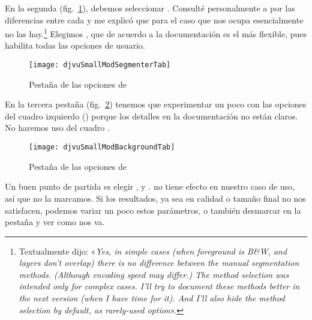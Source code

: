 \documentclass[%
	a5paper,
	10pt,
	twoside,
	openright,
	final,
]{memoir}
\begin{document}
{	En la segunda (fig.~\ref{fig:djvuSmallModSegmenterTab}), debemos seleccionar . Consulté personalmente a \textsharik por las diferencias entre cada  y me explicó que para el caso que nos ocupa esencialmente no las hay.\footnote{Textualmente dijo: «\emph{Yes, in simple cases (when foreground is B\&W, and layers don't overlap) there is no difference between the manual segmentation methods. (Although encoding speed may differ.) The method selection was intended only for complex cases. I'll try to document these methods better in the next version (when I have time for it). And I'll also hide the method selection by default, as rarely-used option}».} Elegimos , que de acuerdo a la documentación es el más flexible, pues habilita todas las opciones de usuario.

	\begin{figure}
		\texttt{[image: djvuSmallModSegmenterTab]}
		\caption[Pestaña \texttt{Segmenter} de las opciones de \djvusmallmod]{Pestaña  de las opciones de \djvusmallmod\label{fig:djvuSmallModSegmenterTab}}
	\end{figure}

	En la tercera pestaña (fig.~\ref{fig:djvuSmallModBackgroundTab}) tenemos que experimentar un poco con las opciones del cuadro izquierdo () porque los detalles en la documentación no están claros. No haremos uso del cuadro .

	\begin{figure}
		\texttt{[image: djvuSmallModBackgroundTab]}
		\caption[Pestaña \texttt{Background} de las opciones de \djvusmallmod]{Pestaña  de las opciones de \djvusmallmod\label{fig:djvuSmallModBackgroundTab}}
	\end{figure}

	Un buen punto de partida es elegir ,  y .  no tiene efecto en nuestro caso de uso, así que no la marcamos. Si los resultados, ya sea en calidad o tamaño final no nos satisfacen, podemos variar un poco estos parámetros, o también desmarcar  en la pestaña  y ver como nos va.%

}
\end{document}
